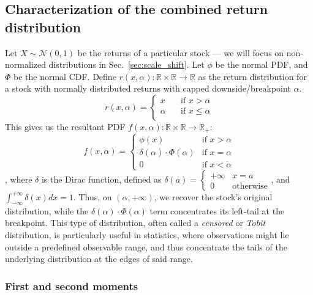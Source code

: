 \documentclass[11pt]{article}
\newcommand{\R}{\mathbb{R}}
\newcommand{\te}{\text}
\begin{document}
\subsection{Characterization of the combined return distribution}

Let $X\sim \mathcal{N}(0, 1)$ be the returns of a particular stock --- we will focus on non-normalized distributions in Sec.~\ref{sec:scale_shift}. Let $\phi$ be the normal PDF, and $\Phi$ be the normal CDF. Define $r(x, \alpha): \R \times \R \to \R$ as the return distribution for a stock with normally distributed returns with capped downside/breakpoint $\alpha$. 
\begin{equation} \label{eq:returns}
    r(x, \alpha) = 
\begin{cases}
    x \quad &\te{if } x > \alpha \\
    \alpha & \te{if }x \leq  \alpha \\
\end{cases}
\end{equation}
This gives us the resultant PDF $f(x, \alpha): \R\times \R \to \R_+$:
\begin{equation} \label{eq:pdf}
    f(x, \alpha) = 
\begin{cases}
    \phi\left( x\right) \quad &\te{if } x> \alpha \\
    \delta(\alpha) \cdot \Phi(\alpha) & \te{if }x = \alpha \\
    0 &\te{if } x< \alpha
\end{cases}
\end{equation}
, where $\delta$ is the Dirac function, defined as $\delta(a) = \begin{cases}
    +\infty & x=a\\ 0 &\te{otherwise}
\end{cases}$, and $\int_{-\infty}^{+\infty} \delta(x)dx= 1$. Thus, on $(\alpha, +\infty)$, we recover the stock's original distribution, while the $ \delta(\alpha) \cdot \Phi(\alpha)$ term concentrates its left-tail at the breakpoint. This type of distribution, often called a \textit{censored} or \textit{Tobit} distribution, is particularly useful in statistics, where observations might lie outside a predefined observable range, and thus concentrate the tails of the underlying distribution at the edges of said range.  

\subsubsection{First and second moments}
\end{document}
